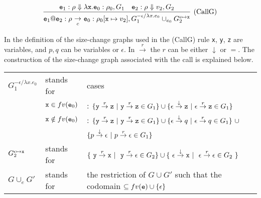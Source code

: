 \documentclass{LMCS}
\newcommand{\fl}{\noindent}
\newcommand{\vair}{\relax}
\newcommand{\bt}{\begin{tabular}}
\newcommand{\et}{\end{tabular}}
\theoremstyle{definition}\newtheorem{env}[thm]{Environment}
\newcommand{\tosub}[1]{\raisebox{-6.0pt}{$\ \stackrel{\textstyle\to}{\vrule height4.5 pt width0 pt
    depth2.5 pt \smash{\scriptstyle#1}}\ $}}
\begin{document}
$$
\infer[(\textnormal{CallG})]{{\tt e}_1{\tt@e}_2:\rho\tosub{c}{\tt e}_0:\rho_0[{\tt x}\mapsto v_2],
G_1^{-\epsilon/\lambda x.e_0}\cup_{e_0}  G_2^{\epsilon\mapsto{\tt x}}}
{{\tt e}_1:\rho\Downarrow \lambda{\tt x.e}_0:\rho_0,G_1
 & {\tt e}_2:\rho\Downarrow v_2,G_2}
$$


\noindent In the definition of the size-change graphs used in the
(CallG) rule {\tt x}, {\tt y}, {\tt z} are variables, and $p,q$ can be
variables or $\epsilon$.  In $\stackrel{r}{\to}$ the $r$ can be either
$\downarrow$ or $=$.  The construction of the size-change graph
associated with the call is explained below.  \vair


\fl\bt{lll}
$G_1^{-\epsilon/\lambda x.e_0}$&stands for&cases\\

&${\tt x}\in fv({\tt e}_0)$&:   
$\{{\tt y}\stackrel{r}{\to}{\tt z}  \ |\  {\tt y}\stackrel{r}{\to}{\tt z} \in G_1\}\cup
\{\epsilon\stackrel{\downarrow}{\to}{\tt z} \ | \  \epsilon\stackrel{r}{\to}{\tt z}\in G_1\}$\\

&${\tt x}\notin fv({\tt e}_0)$&: $\{{\tt y}\stackrel{r}{\to}{\tt z}  \ |\ {\tt y}\stackrel{r}{\to}{\tt z} \in G_1\}\cup
     \{\epsilon\stackrel{\downarrow}{\to}q  \ | \ \epsilon\stackrel{r}{\to}q \in G_1\}\ \cup$ \\
&&     $\hfill 
     \{p\stackrel{\downarrow}{\to}\epsilon  \ | \ p\stackrel{r}{\to}\epsilon \in G_1\}$\\

$G^{\epsilon\mapsto{\tt x}}_2$  &stands for& 
$\{\ {\tt y}\stackrel{r}{\to}{\tt x}\  |\ \
   {\tt y}\stackrel{r}{\to}\epsilon \in G_2\}
 \cup
 \{\ \epsilon\stackrel{\downarrow}{\to}{\tt x}\  |\ \
   \epsilon\stackrel{r}{\to}\epsilon \in G_2\ \}$\\

$G\cup_{e}G'$ &stands for&the restriction of $G\cup G'$ such that the codomain $\subseteq fv({\tt e})\cup\{\epsilon\}$\\
\et
\bigskip
\end{document}
